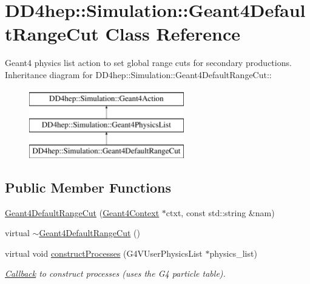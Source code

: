 \hypertarget{class_d_d4hep_1_1_simulation_1_1_geant4_default_range_cut}{
\section{DD4hep::Simulation::Geant4DefaultRangeCut Class Reference}
\label{class_d_d4hep_1_1_simulation_1_1_geant4_default_range_cut}
}


Geant4 physics list action to set global range cuts for secondary productions.  
Inheritance diagram for DD4hep::Simulation::Geant4DefaultRangeCut::\begin{figure}[H]
\begin{center}
\leavevmode
\includegraphics[height=3cm]{class_d_d4hep_1_1_simulation_1_1_geant4_default_range_cut}
\end{center}
\end{figure}
\subsection*{Public Member Functions}
\begin{DoxyCompactItemize}
\item 
\hyperlink{class_d_d4hep_1_1_simulation_1_1_geant4_default_range_cut_ab3e4d2b49a9aab9f42d04f5c73f7e5b4}{Geant4DefaultRangeCut} (\hyperlink{class_d_d4hep_1_1_simulation_1_1_geant4_context}{Geant4Context} $\ast$ctxt, const std::string \&nam)
\item 
virtual \hyperlink{class_d_d4hep_1_1_simulation_1_1_geant4_default_range_cut_a32d4c8eb8988913c4ed1c8ad6e2ab893}{$\sim$Geant4DefaultRangeCut} ()
\item 
virtual void \hyperlink{class_d_d4hep_1_1_simulation_1_1_geant4_default_range_cut_a5625f1bf8f0c47bb6b29c73ce3e590eb}{constructProcesses} (G4VUserPhysicsList $\ast$physics\_\-list)
\begin{DoxyCompactList}\small\item\em \hyperlink{class_d_d4hep_1_1_callback}{Callback} to construct processes (uses the G4 particle table). \item\end{DoxyCompactList}\end{DoxyCompactItemize}

